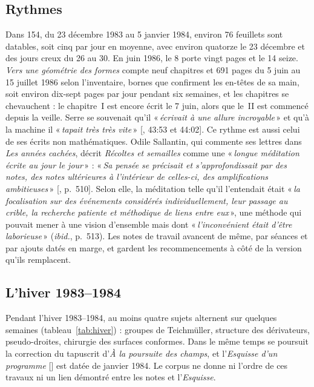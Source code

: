 \documentclass[11pt]{amsart}
\newcommand{\ts}[1]{\foreignlanguage{english}{#1}}
\newcommand{\q}[1]{«\,\textit{#1}\,»}
\begin{document}
\subsection{Rythmes}

Dans 154, du 23 décembre 1983 au 5 janvier 1984, environ 76 feuillets sont datables, soit cinq par jour en moyenne, avec environ quatorze le 23 décembre et des jours creux du 26 au 30. En juin 1986, le 8 porte vingt pages et le 14 seize. \emph{Vers une géométrie des formes} compte neuf chapitres et 691 pages du 5 juin au 15 juillet 1986 selon l'inventaire, bornes que confirment les en-têtes de sa main, soit environ dix-sept pages par jour pendant six semaines, et les chapitres se chevauchent : le chapitre~I est encore écrit le 7 juin, alors que le~II est commencé depuis la veille. Serre se souvenait qu'il \q{écrivait à une allure incroyable} et qu'à la machine il \q{tapait très très vite} [\citealp{serreconnes2019}, \ts{43:53} et \ts{44:02}]. Ce rythme est aussi celui de ses écrits non mathématiques. Odile Sallantin, qui commente ses lettres dans \emph{Les années cachées}, décrit \emph{Récoltes et semailles} comme une \q{longue méditation écrite au jour le jour} : \q{Sa pensée se précisait et s'approfondissait par des notes, des notes ultérieures à l'intérieur de celles-ci, des amplifications ambitieuses} [\citealp{grothendieck2025}, p.~510]. Selon elle, la méditation telle qu'il l'entendait était \q{la focalisation sur des événements considérés individuellement, leur passage au crible, la recherche patiente et méthodique de liens entre eux}, une méthode qui pouvait mener à une vision d'ensemble mais dont \q{l'inconvénient était d'être laborieuse} (\emph{ibid.}, p.~513). Les notes de travail avancent de même, par séances et par ajouts datés en marge, et gardent les recommencements à côté de la version qu'ils remplacent.

\subsection{L'hiver 1983--1984}

Pendant l'hiver 1983--1984, au moins quatre sujets alternent sur quelques semaines (tableau~\ref{tab:hiver}) : groupes de Teichmüller, structure des dérivateurs, pseudo-droites, chirurgie des surfaces conformes. Dans le même temps se poursuit la correction du tapuscrit d'\emph{À la poursuite des champs}, et l'\emph{Esquisse d'un programme} [\citealp{grothendieck1997}] est datée de janvier 1984. Le corpus ne donne ni l'ordre de ces travaux ni un lien démontré entre les notes et l'\emph{Esquisse}.
\end{document}
